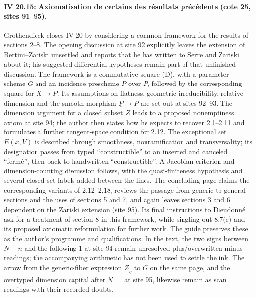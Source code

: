 \documentclass[10pt,a4paper]{article}
\begin{document}
\par{}
\paragraph{IV 20.15: Axiomatisation de certains des résultats précédents (cote 25, sites 91--95).}
Grothendieck closes IV 20 by considering a common framework for the results of sections 2--8. The opening discussion at site 92 explicitly leaves the extension of Bertini--Zariski unsettled and reports that he has written to Serre and Zariski about it; his suggested differential hypotheses remain part of that unfinished discussion. The framework is a commutative square (D), with a parameter scheme $G$ and an incidence prescheme $\underline P$ over $P$, followed by the corresponding square for $X\to P$. Its assumptions on flatness, geometric irreducibility, relative dimension and the smooth morphism $\underline P\to P$ are set out at sites 92--93. The dimension argument for a closed subset $Z$ leads to a proposed nonemptiness axiom at site 94; the author then states how he expects to recover 2.1--2.11 and formulates a further tangent-space condition for 2.12. The exceptional set $E(x,V)$ is described through smoothness, nonramification and transversality; its designation passes from typed ``constructible'' to an inserted and canceled ``fermé'', then back to handwritten ``constructible''. A Jacobian-criterion and dimension-counting discussion follows, with the quasi-finiteness hypothesis and several closed-set labels added between the lines. The concluding page claims the corresponding variants of 2.12--2.18, reviews the passage from generic to general sections and the uses of sections 5 and 7, and again leaves sections 3 and 6 dependent on the Zariski extension (site 95). Its final instructions to Dieudonné ask for a treatment of section 8 in this framework, while singling out 8.7(c) and its proposed axiomatic reformulation for further work. The guide preserves these as the author's programme and qualifications. In the text, the two signs between $N-n$ and the following $1$ at site 94 remain unresolved plus/overwritten-minus readings; the accompanying arithmetic has not been used to settle the ink. The arrow from the generic-fiber expression $\underline Z_\eta$ to $G$ on the same page, and the overtyped dimension capital after $N=$ at site 95, likewise remain as scan readings with their recorded doubts.
\par{}
\end{document}
